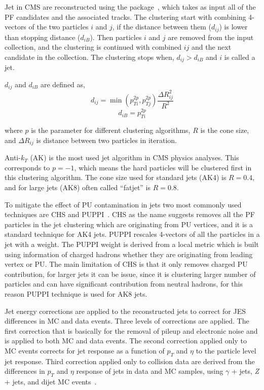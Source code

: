 Jet in \gls{CMS} are reconstructed using the \FASTJET{} package~\cite{fastjet-manual},
which takes as input all of the \gls{PF} candidates and the associated tracks.
The clustering start with combining 4-vectors of the two particles \(i\) and  \(j\), if the distance between
them (\( d_{ij} \)) is lower than stopping distance (\( d_{iB} \)).
Then particles \(i\) and  \(j\) are removed from the input collection,
and the clustering is continued with combined \(ij\) and the next candidate in
the collection.
The clustering stops when, \( d_{ij} > d_{iB} \) and \( i \) is called a jet.

\( d_{ij} \) and \( d_{iB} \) are defined as,
%
\begin{equation}
  d_{ij} = \min (p_{Ti}^{2p}, p_{Tj}^{2p}) \frac{\Delta R_{ij}^{2}}{R^{2}}
\end{equation}
%
\begin{equation}
  d_{iB} = p_{Ti}^{2p}
\end{equation}

where \( p \) is the parameter for different clustering algorithms, \( R \) is the
cone size, and
\( \Delta R_{ij} \) is distance between two particles in iteration.

Anti-\( k_T \) (AK) is the most used jet algorithm in \gls{CMS} physics analyses. This corresponds to
\( p = -1\), which means the hard particles will be clustered first in this clustering
algorithm.
The cone size used for standard jets (AK4) is \( R = 0.4 \), and for large jets (AK8) often called
``fatjet'' is \( R = 0.8 \).

To mitigate the effect of \gls{PU} contamination in jets two most commonly used
techniques are \gls{CHS} and \gls{PUPPI}~\cite{puppi2014}.
\gls{CHS} as the name suggests removes all the \gls{PF} particles in the jet clustering which are
originating from \gls{PU} vertices, and it is a standard technique for AK4 jets.
\gls{PUPPI} rescales 4-vectors of all the particles in a jet with a weight.
The \gls{PUPPI} weight is derived from a local metric which is built
using information of charged hadrons whether they are
originating from leading vertex or \gls{PU}.
The main limitation of \gls{CHS} is that it only removes charged \gls{PU} contribution,
for larger jets it can be issue, since it is clustering larger number of particles
and can have significant contribution from neutral hadrons, for this reason \gls{PUPPI}
technique is used for AK8 jets.

Jet energy corrections are applied to the reconstructed
jets to correct for \gls{JES} differences in \gls{MC} and data events.
Three levels of corrections are applied.
The first correction that is basically for the removal of pileup and electronic noise
and is applied to both \gls{MC} and data events. The
second correction applied only to \gls{MC} events
corrects for jet response as a function of \( p_T \) and
\( \eta \) to the particle level jet response. Third
correction applied only to collision data
are derived from the differences in \(p_T\) and \(\eta \)
response of jets in data and \gls{MC} samples,
using \( \gamma \) + jets, \textit{Z} + jets, and dijet \gls{MC} events~\cite{CMS-DP-2020-019}.

